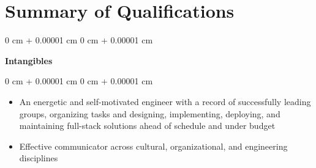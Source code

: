 \documentclass[10pt, letterpaper]{article}
\newenvironment{highlightsforbulletentries}{
    \begin{itemize}[
        topsep=0.10 cm,
        parsep=0.10 cm,
        partopsep=0pt,
        itemsep=0pt,
        leftmargin=10pt
    ]
}{
    \end{itemize}
} %
\newenvironment{onecolentry}{
    \begin{adjustwidth}{
        0 cm + 0.00001 cm
    }{
        0 cm + 0.00001 cm
    }
}{
    \end{adjustwidth}
} %
\newenvironment{twocolentry}[2][]{
    \onecolentry
    \def\secondColumn{#2}
    \setcolumnwidth{\fill, 4.5 cm}
    \begin{paracol}{2}
}{
    \switchcolumn \raggedleft \secondColumn
    \end{paracol}
    \endonecolentry
} %
\begin{document}
    
    \section{Summary of Qualifications}
    \begin{twocolentry}{
        }
            \textbf{\large Intangibles}
    \end{twocolentry}
    \begin{onecolentry}
        \begin{highlightsforbulletentries}
            \item An energetic and self-motivated engineer with a record of successfully leading groups, organizing tasks and designing, implementing, deploying, and maintaining full-stack solutions ahead of schedule and under budget
            \item Effective communicator across cultural, organizational, and engineering disciplines
        \end{highlightsforbulletentries}
    \end{onecolentry}

    \vspace{0.20 cm}
\end{document}
